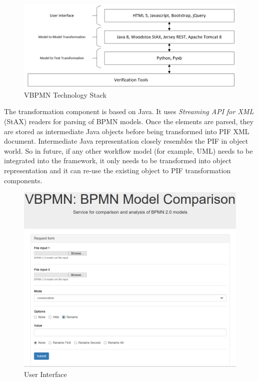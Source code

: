 \documentclass{article}
\begin{document}
\begin{figure}[ht]
\center
\includegraphics[scale =0.4]{TechStack.png}
\caption{VBPMN Technology Stack}
\label{fig:techstack}
\end{figure}

The transformation component is based on Java. It uses \textit{Streaming API for XML} (StAX) \cite{Stax:Ref} readers for parsing of BPMN models. Once the elements are parsed, they are stored as intermediate Java objects before being transformed into PIF XML document. Intermediate Java representation closely resembles the PIF in object world. So in future, if any other workflow model (for example, UML) needs to be integrated into the framework, it only needs to be transformed into object representation and it can re-use the existing object to PIF transformation components. 

\begin{figure}[ht]
\center
\includegraphics[scale =0.4]{UI.png}
\caption{User Interface}
\label{fig:ui}
\end{figure}
\end{document}
